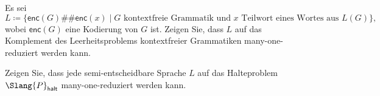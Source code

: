 \documentclass[german]{latteachCD}[2017/03/28]
\begin{document}
\begin{exercise}
  Es sei
  \begin{equation*}
    L \coloneqq \{\mathsf{enc}(G)\#\#\mathsf{enc}(x) \mid G \text{ kontextfreie
      Grammatik und $x$ Teilwort eines Wortes aus } L(G)\},
  \end{equation*}
  wobei $\mathsf{enc}(G)$ eine Kodierung von $G$ ist.  Zeigen Sie, dass $L$ auf
  das Komplement des Leerheitsproblems kontextfreier Grammatiken
  many-one-reduziert werden kann.

\end{exercise}

\begin{exercise}
  Zeigen Sie, dass jede semi-entscheidbare Sprache $L$ auf das Halteproblem
  $\Slang{P}_{\mathsf{halt}}$ many-one-reduziert werden kann.
\end{exercise}
\end{document}
